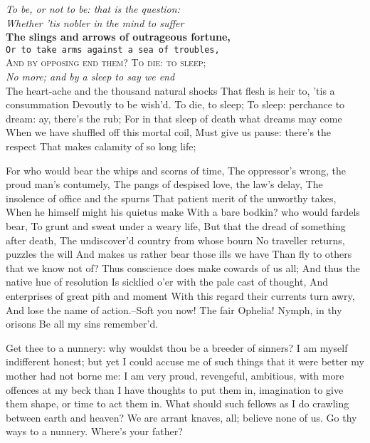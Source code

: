 \documentclass{article}
\begin{document}
\noindent
\textit{To be, or not to be: that is the question:}\\ %
\textsl{Whether 'tis nobler in the mind to suffer}\\ %
\textbf{The slings and arrows of outrageous fortune,}\\ %
\texttt{Or to take arms against a sea of troubles,}\\ %
\textsc{And by opposing end them? To die: to sleep;}\\ %
\emph{No more; and by a sleep to say we end}\\ %
The heart-ache and the thousand natural shocks
That flesh is heir to, 'tis a consummation
Devoutly to be wish'd. To die, to sleep;
To sleep: perchance to dream: ay, there's the rub;
For in that sleep of death what dreams may come
When we have shuffled off this mortal coil,
Must give us pause: there's the respect
That makes calamity of so long life;

\newpage

For who would bear the whips and scorns of time,
The oppressor's wrong, the proud man's contumely,
The pangs of despised love, the law's delay,
The insolence of office and the spurns
That patient merit of the unworthy takes,
When he himself might his quietus make
With a bare bodkin? who would fardels bear,
To grunt and sweat under a weary life,
But that the dread of something after death,
The undiscover'd country from whose bourn
No traveller returns, puzzles the will
And makes us rather bear those ills we have
Than fly to others that we know not of?
Thus conscience does make cowards of us all;
And thus the native hue of resolution
Is sicklied o'er with the pale cast of thought,
And enterprises of great pith and moment
With this regard their currents turn awry,
And lose the name of action.--Soft you now!
The fair Ophelia! Nymph, in thy orisons
Be all my sins remember'd.

Get thee to a nunnery: why wouldst thou be a
breeder of sinners? I am myself indifferent honest;
but yet I could accuse me of such things that it
were better my mother had not borne me: I am very
proud, revengeful, ambitious, with more offences at
my beck than I have thoughts to put them in,
imagination to give them shape, or time to act them
in. What should such fellows as I do crawling
between earth and heaven? We are arrant knaves,
all; believe none of us. Go thy ways to a nunnery.
Where's your father?
\end{document}
